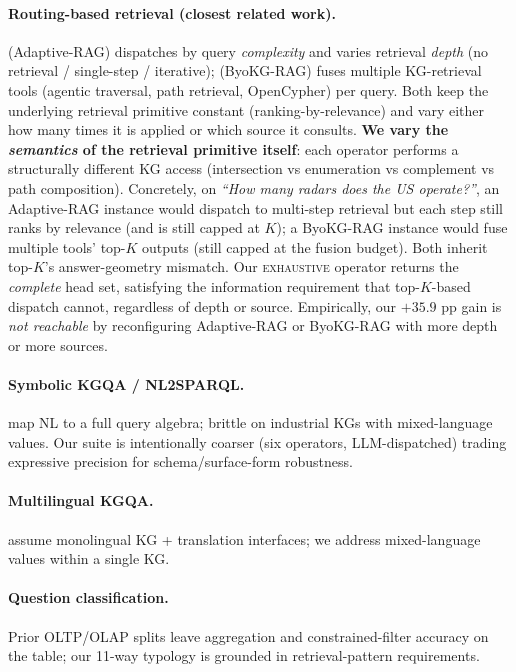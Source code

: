 \documentclass[11pt,a4paper]{article}
\newcommand{\op}[1]{\textsc{\small #1}}
\begin{document}
\paragraph{Routing-based retrieval (closest related work).} \citet{jeong2024adaptiverag} (Adaptive-RAG) dispatches by query \emph{complexity} and varies retrieval \emph{depth} (no retrieval / single-step / iterative); \citet{byokgrag2025} (ByoKG-RAG) fuses multiple KG-retrieval tools (agentic traversal, path retrieval, OpenCypher) per query. Both keep the underlying retrieval primitive constant (ranking-by-relevance) and vary either how many times it is applied or which source it consults. \textbf{We vary the \emph{semantics} of the retrieval primitive itself}: each operator performs a structurally different KG access (intersection vs enumeration vs complement vs path composition). Concretely, on \emph{``How many radars does the US operate?''}, an Adaptive-RAG instance would dispatch to multi-step retrieval but each step still ranks by relevance (and is still capped at $K$); a ByoKG-RAG instance would fuse multiple tools' top-$K$ outputs (still capped at the fusion budget). Both inherit top-$K$'s answer-geometry mismatch. Our \op{exhaustive} operator returns the \emph{complete} head set, satisfying the information requirement that top-$K$-based dispatch cannot, regardless of depth or source. Empirically, our $+35.9$ pp gain is \emph{not reachable} by reconfiguring Adaptive-RAG or ByoKG-RAG with more depth or more sources.

\paragraph{Symbolic KGQA / NL2SPARQL.} \citet{jiang2023structgpt,baek2023kaping} map NL to a full query algebra; brittle on industrial KGs with mixed-language values. Our suite is intentionally coarser (six operators, LLM-dispatched) trading expressive precision for schema/surface-form robustness.

\paragraph{Multilingual KGQA.} \citet{perevalov2024multilingual} assume monolingual KG + translation interfaces; we address mixed-language values within a single KG.

\paragraph{Question classification.} Prior OLTP/OLAP splits leave aggregation and constrained-filter accuracy on the table; our 11-way typology is grounded in retrieval-pattern requirements.
\end{document}
